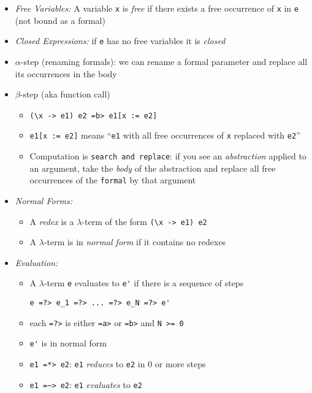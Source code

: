 \documentclass[landscape,8pt]{extarticle}
\newcommand{\code}{\lstinline}
\begin{document}
\begin{multicols}{4}
\begin{itemize}
        \item \emph{Free Variables:} A variable \code{x} is \emph{free} if there exists a free occurrence of \code{x} in \code{e} (not bound as a formal)
            \item \emph{Closed Expressions:} if \code{e} has no free variables it is \emph{closed}
            \item $\alpha$-step (renaming formals): we can rename a formal parameter and replace all its occurrences in the body
            \item $\beta$-step (aka function call)
            \begin{itemize}
                \item \code{(\x -> e1) e2 =b> e1[x := e2]}
                \item \code{e1[x := e2]} means ``\code{e1} with all free occurrences of \code{x} replaced with \code{e2}''
                \item Computation is \code{search and replace}: if you see an \emph{abstraction} applied to an argument, take the \emph{body} of the abstraction and replace all free occurrences of the \code{formal} by that argument
            \end{itemize}
            \item \emph{Normal Forms:}
            \begin{itemize}
                \item A \emph{redex} is a $\lambda$-term of the form \code{(\x -> e1) e2}
                \item A $\lambda$-term is in \emph{normal form} if it contains no redexes
            \end{itemize}
            \item \emph{Evaluation:}
            \begin{itemize}
                \item A $\lambda$-term \code{e} evaluates to \code{e'} if there is a sequence of steps
                \begin{lstlisting}
e =?> e_1 =?> ... =?> e_N =?> e'
                \end{lstlisting}
                \item each \code{=?>} is either \code{=a>} or \code{=b>} and \code{N >= 0}
                \item \code{e'} is in normal form
                \item \code{e1 =*> e2}: \code{e1} \emph{reduces} to \code{e2} in 0 or more steps
                \item \code{e1 =~> e2}: \code{e1} \emph{evaluates} to \code{e2}

\end{itemize}
\end{itemize}
\end{multicols}
\end{document}
